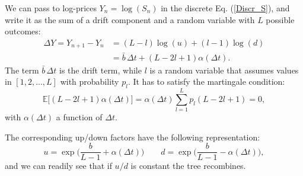 \documentclass[]{interact}
\newcommand{\numberset}{\mathbb}
\newcommand{\E}{\numberset{E}}
\theoremstyle{plain}%
\theoremstyle{definition}
\theoremstyle{remark}
\begin{document}
We can pass to log-prices $Y_n = \log(S_n)$ in the discrete Eq. (\ref{Discr_S}), and write it as the sum of a drift component and a 
random variable with $L$ possible outcomes:
\begin{align}\label{Discr_Y}
 \Delta Y = Y_{n+1} - Y_n &= (L-l) \log(u) + (l-1) \log(d) \\ \nonumber
  &= \bar b\, \Delta t + (L-2l+1) \alpha(\Delta t).
\end{align}
The term $\bar b\, \Delta t$ is the drift term, while $l$ is a random variable that assumes values in $[1,2,...,L]$ with probability $p_l$. 
It has to satisfy the martingale condition:
$$ \E \bigl[(L-2l+1) \alpha(\Delta t) \bigr] = \alpha(\Delta t) \sum_{l=1}^L p_l (L-2l+1) = 0, $$
with $\alpha(\Delta t)$ a function of $\Delta t$.

The corresponding up/down factors have the following representation:
\begin{equation}\label{updown}
 u = \exp\biggl( \frac{b}{L-1} + \alpha(\Delta t) \biggr) \hspace{2em}  d = \exp\biggl( \frac{b}{L-1} - \alpha(\Delta t) \biggr),
\end{equation}
and we can readily see that if $u/d$ is constant the tree recombines.
\end{document}
